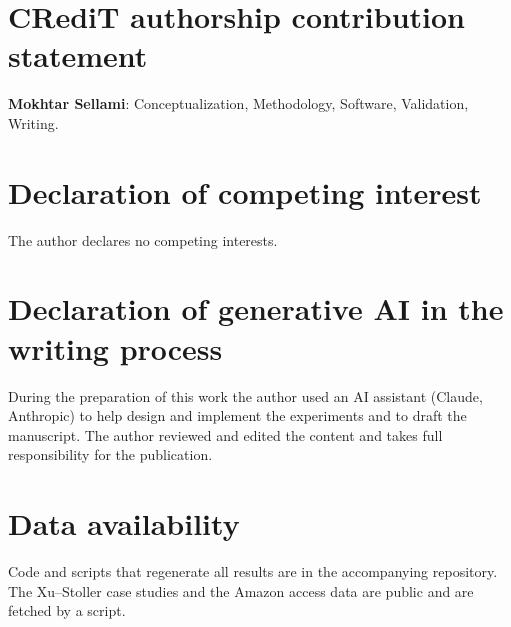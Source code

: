 \documentclass[preprint,12pt]{elsarticle}
\theoremstyle{definition}
\begin{document}
\section*{CRediT authorship contribution statement}
\textbf{Mokhtar Sellami}: Conceptualization, Methodology, Software, Validation, Writing.

\section*{Declaration of competing interest}
The author declares no competing interests.

\section*{Declaration of generative AI in the writing process}
During the preparation of this work the author used an AI assistant (Claude, Anthropic) to help design and implement the experiments and to draft the manuscript. The author reviewed and edited the content and takes full responsibility for the publication.

\section*{Data availability}
Code and scripts that regenerate all results are in the accompanying repository. The Xu--Stoller case studies and the Amazon access data are public and are fetched by a script.



\end{document}
